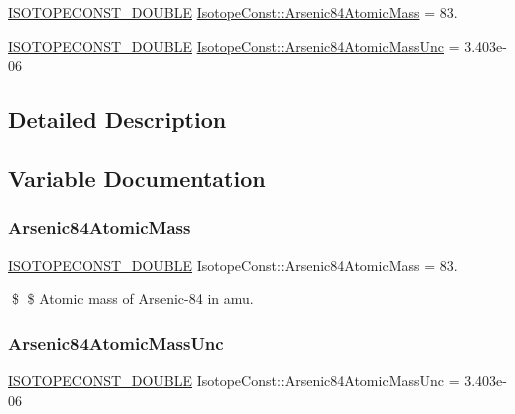 \begin{DoxyCompactItemize}
\item 
\mbox{\hyperlink{group___isotope_const-_macros_ga8f45a7272ce02c0b4c65c44636ed719a}{I\+S\+O\+T\+O\+P\+E\+C\+O\+N\+S\+T\+\_\+\+D\+O\+U\+B\+LE}} \mbox{\hyperlink{group___isotope_const-_arsenic-_as84_gae97bd5b810814dcf815767ee44863e6e}{Isotope\+Const\+::\+Arsenic84\+Atomic\+Mass}} = 83.
\item 
\mbox{\hyperlink{group___isotope_const-_macros_ga8f45a7272ce02c0b4c65c44636ed719a}{I\+S\+O\+T\+O\+P\+E\+C\+O\+N\+S\+T\+\_\+\+D\+O\+U\+B\+LE}} \mbox{\hyperlink{group___isotope_const-_arsenic-_as84_ga31e9e9bf0679e67b0749f23d8d2c413b}{Isotope\+Const\+::\+Arsenic84\+Atomic\+Mass\+Unc}} = 3.\+403e-\/06
\end{DoxyCompactItemize}


\subsection{Detailed Description}


\subsection{Variable Documentation}
\mbox{\label{group___isotope_const-_arsenic-_as84_gae97bd5b810814dcf815767ee44863e6e}} 
\subsubsection{\texorpdfstring{Arsenic84\+Atomic\+Mass}{Arsenic84AtomicMass}}
{\footnotesize\ttfamily \mbox{\hyperlink{group___isotope_const-_macros_ga8f45a7272ce02c0b4c65c44636ed719a}{I\+S\+O\+T\+O\+P\+E\+C\+O\+N\+S\+T\+\_\+\+D\+O\+U\+B\+LE}} Isotope\+Const\+::\+Arsenic84\+Atomic\+Mass = 83.}

\$ \$ Atomic mass of Arsenic-\/84 in amu. \mbox{\label{group___isotope_const-_arsenic-_as84_ga31e9e9bf0679e67b0749f23d8d2c413b}} 
\subsubsection{\texorpdfstring{Arsenic84\+Atomic\+Mass\+Unc}{Arsenic84AtomicMassUnc}}
{\footnotesize\ttfamily \mbox{\hyperlink{group___isotope_const-_macros_ga8f45a7272ce02c0b4c65c44636ed719a}{I\+S\+O\+T\+O\+P\+E\+C\+O\+N\+S\+T\+\_\+\+D\+O\+U\+B\+LE}} Isotope\+Const\+::\+Arsenic84\+Atomic\+Mass\+Unc = 3.\+403e-\/06}

